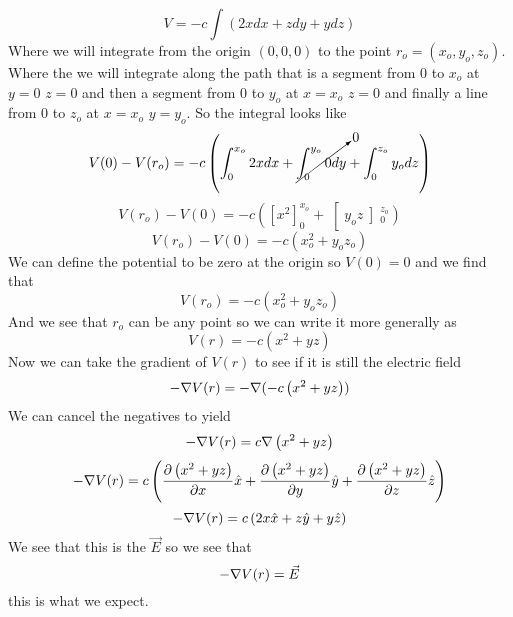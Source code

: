 \documentclass[11pt]{article}
\numberwithin{equation}{section}
\newcommand{\grad}{\bold\nabla}
\newcommand{\vecE}{\vec{E}}
\begin{document}
$$V = -c\int(2xdx + zdy + ydz)$$
Where we will integrate from the origin $(0,0,0)$ to the point $r_o = (x_o,y_o,z_o)$. Where the we will integrate along the path that is a segment from $0$ to $x_o$ at $y=0$ $z=0$ and then a segment from $0$ to $y_o$ at $x=x_o$ $z=0$ and finally a line from $0$ to $z_o$ at $x=x_o$ $y=y_o$. So the integral looks like
$$V(0) - V(r_o) = -c\left(\int_0^{x_o}2xdx + \cancelto{0}{\int_0^{y_o}0dy} + \int_0^{z_o}y_odz\right)$$
$$V(r_o) - V(0) = -c\left(\left[x^2\right]_0^{x_o} + \right[y_o z\left]_0^{z_o}\right)$$
$$V(r_o) - V(0)= -c\left(x_o^2 + y_o z_o\right)$$
We can define the potential to be zero at the origin so $V(0) = 0$ and we find that
$$V(r_o) = - c\left(x_o^2 + y_o z_o\right)$$
And we see that $r_o$ can be any point so we can write it more generally as
\begin{equation}
V(r) = -c\left(x^2 + y z\right)
\label{poten}
\end{equation}
Now we can take the gradient of $V(r)$ to see if it is still the electric field
$$-\grad V(r) = -\grad(-c\left(x^2 + y z\right))$$
We can cancel the negatives to yield
$$-\grad V(r) = c\grad\left(x^2 + y z\right)$$
$$-\grad V(r) = c\left(\frac{\partial\left(x^2 + y z\right)}{\partial x}\hat{x}+\frac{\partial\left(x^2 + y z\right)}{\partial y}\hat{y}+\frac{\partial\left(x^2 + y z\right)}{\partial z}\hat{z}\right)$$
$$-\grad V(r) = c\left(2x\hat{x} + z \hat{y}+ y\hat{z}\right)$$
We see that this is the $\vecE$ so we see that
$$-\grad V(r) = \vecE$$
this is what we expect.
\end{document}
